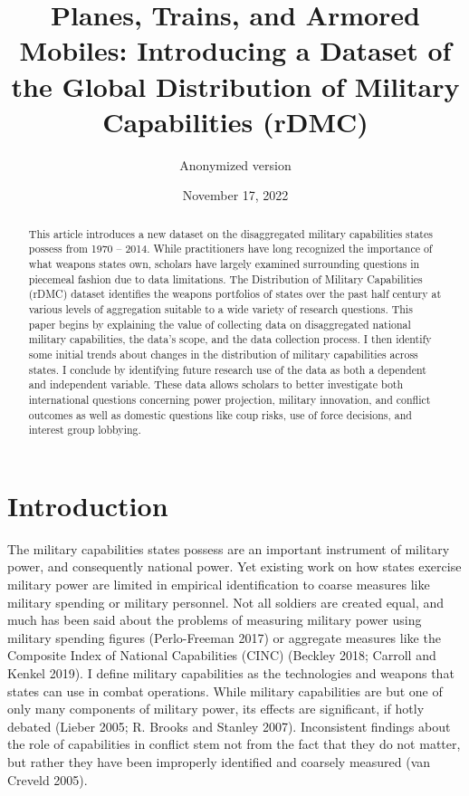 \documentclass[
]{article}
\title{\singlespacing Planes, Trains, and Armored Mobiles: Introducing a Dataset of the Global Distribution of Military Capabilities (rDMC)}
\author{Anonymized version}
\date{November 17, 2022}
\begin{document}
\maketitle
\begin{abstract}
\singlespacing \noindent This article introduces a new dataset on the disaggregated military capabilities states possess from 1970 -- 2014. While practitioners have long recognized the importance of what weapons states own, scholars have largely examined surrounding questions in piecemeal fashion due to data limitations. The Distribution of Military Capabilities (rDMC) dataset identifies the weapons portfolios of states over the past half century at various levels of aggregation suitable to a wide variety of research questions. This paper begins by explaining the value of collecting data on disaggregated national military capabilities, the data's scope, and the data collection process. I then identify some initial trends about changes in the distribution of military capabilities across states. I conclude by identifying future research use of the data as both a dependent and independent variable. These data allows scholars to better investigate both international questions concerning power projection, military innovation, and conflict outcomes as well as domestic questions like coup risks, use of force decisions, and interest group lobbying.
\end{abstract}

\newpage

\hypertarget{introduction}{%
\section{Introduction}\label{introduction}}

The military capabilities states possess are an important instrument of military power, and consequently national power. Yet existing work on how states exercise military power are limited in empirical identification to coarse measures like military spending or military personnel. Not all soldiers are created equal, and much has been said about the problems of measuring military power using military spending figures (Perlo-Freeman 2017) or aggregate measures like the Composite Index of National Capabilities (CINC) (Beckley 2018; Carroll and Kenkel 2019). I define military capabilities as the technologies and weapons that states can use in combat operations. While military capabilities are but one of only many components of military power, its effects are significant, if hotly debated (Lieber 2005; R. Brooks and Stanley 2007). Inconsistent findings about the role of capabilities in conflict stem not from the fact that they do not matter, but rather they have been improperly identified and coarsely measured (van Creveld 2005).
\end{document}
